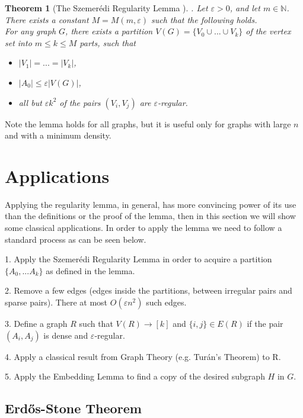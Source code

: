 \documentclass[12pt,twoside,a4paper,bibliography=totocnumbered]{book}
\numberwithin{equation}{section}
\newtheorem{theorem}             {Theorem}[section]
\theoremstyle{remark}
\begin{document}
\begin{theorem}[{The Szemerédi Regularity Lemma \cite{Sz75}}]. Let $\varepsilon > 0$, and let $m \in  \mathbb{N}$. There exists a constant $M=M(m,\varepsilon)$ such that the following holds.\\
For any graph $G$, there exists a partition $V(G) = \{V_0 \cup ... \cup V_k\}$ of the vertex set into $m \leq k \leq M$ parts, such that
\begin{itemize}

	\item $|V_1| = ... =|V_k|$,
	
	\item $|A_0| \leq \varepsilon|V(G)|$,
	\item all but $\varepsilon k^2$ of the pairs $(V_i, V_j)$ are $\varepsilon$-regular. 
\end{itemize}
\end{theorem}

Note the lemma holds for all graphs, but it is useful only for graphs with large $n$ and with a minimum density.%

\section{Applications}
Applying the regularity lemma, in general, has more convincing power of its use than the definitions or the proof of the lemma, then in this section we will show some classical applications. In order to apply the lemma we need to follow a standard process as can be seen below.

1. Apply the Szemerédi Regularity Lemma in order to acquire a partition $ \{ A_0, ... A_k \} $ as defined in the lemma.

2. Remove a few edges (edges inside the partitions, between irregular pairs and sparse pairs). There at most $O(\varepsilon n^2)$ such edges.

3. Define a graph $R$ such that $V(R) \rightarrow [k]$ and $\{i,j\} \in E(R) $ if  the pair $(A_i, A_j)$ is dense and $\varepsilon$-regular.

4. Apply a classical result from Graph Theory (e.g. Turán's Theorem) to R.

5. Apply the Embedding Lemma to find a copy of the desired subgraph $H$ in $G$.
\subsection{Erd\H{o}s-Stone Theorem}
\end{document}
